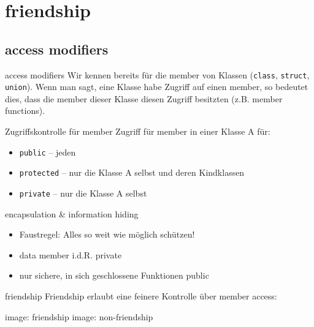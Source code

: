 \section{friendship}




\subsection{access modifiers}

\begin{frame}[fragile]{access modifiers}
	Wir kennen bereits für die member von Klassen (\verb|class|, \verb|struct|, \verb|union|).
	Wenn man sagt, eine Klasse habe Zugriff auf einen member, so bedeutet dies, dass die member dieser Klasse diesen Zugriff besitzten (z.B. member functions).
	
	\pause
	
	\begin{block}{Zugriffskontrolle für member}
		Zugriff für member in einer Klasse A für:
		\begin{itemize}[<+->]
			\item \verb|public| -- jeden
			\item \verb|protected| -- nur die Klasse A selbst und deren Kindklassen
			\item \verb|private| -- nur die Klasse A selbst
		\end{itemize}
	\end{block}
\end{frame}


\begin{frame}{encapsulation \& information hiding}
	\begin{itemize}[<+->]
		\item Faustregel: Alles so weit wie möglich schützen!
		\item data member i.d.R. private
		\item nur sichere, in sich geschlossene Funktionen public
	\end{itemize}
\end{frame}


\begin{frame}{friendship}
	Friendship erlaubt eine feinere Kontrolle über member access:
	
	{%
		image: friendship
	}{%
		image: non-friendship
	}
\end{frame}




